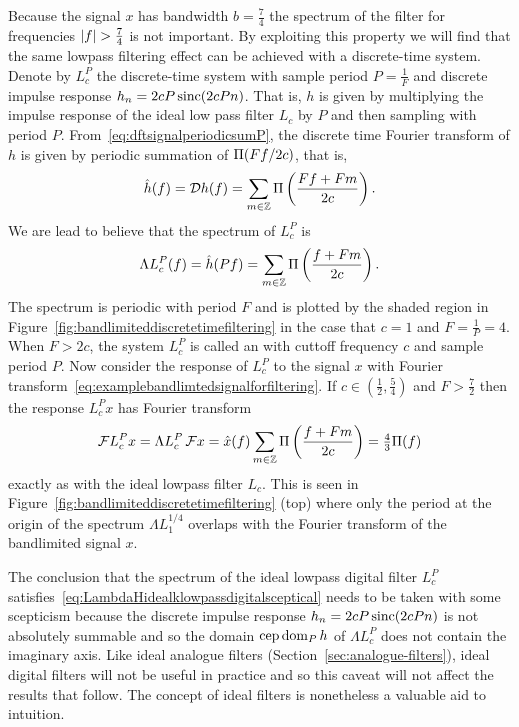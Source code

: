 Because the signal $x$ has bandwidth $b = \tfrac{7}{4}$ the spectrum of the filter for frequencies $\left\vert f \right\vert > \tfrac{7}{4}$ is not important.  By exploiting this property we will find that the same lowpass filtering effect can be achieved with a discrete-time system.  Denote by $L_{c}^P$ the discrete-time system with sample period $P = \tfrac{1}{F}$ and discrete impulse response $h_n = 2cP \operatorname{sinc}(2c Pn)$.  That is, $h$ is given by multiplying the impulse response of the ideal low pass filter $L_c$ by $P$ and then sampling with period $P$.  From~\eqref{eq:dftsignalperiodicsumP}, the discrete time Fourier transform of $h$ is given by periodic summation of $\Pi(Ff/2c)$, that is,
\[
\hat{h}(f) = {\mathcal D} h(f) = \sum_{m \in {\mathbb Z}} \Pi\left( \frac{Ff + Fm}{2c}\right).
\] 
We are lead to believe that the spectrum of $L_c^P$ is
\begin{equation}\label{eq:LambdaHidealklowpassdigitalsceptical}
\Lambda L_c^P(f) = \hat{h}(Pf) = \sum_{m \in {\mathbb Z}} \Pi\left( \frac{f + Fm}{2c}\right).
\end{equation}
The spectrum is periodic with period $F$ and is plotted by the shaded region in Figure~\ref{fig:bandlimiteddiscretetimefiltering} in the case that $c = 1$ and $F = \tfrac{1}{P} = 4$.  When $F > 2c$, the system $L_c^P$ is called an  with cuttoff frequency $c$ and sample period $P$. Now consider the response of $L_c^P$ to the signal $x$ with Fourier transform~\ref{eq:examplebandlimtedsignalforfiltering}.  If $c \in (\tfrac{1}{2}, \tfrac{5}{4})$ and $F > \tfrac{7}{2}$ then the response $L_c^Px$ has Fourier transform
\[
{\mathcal F} L_c^P x = \Lambda L_c^P \, {\mathcal F} x = \hat{x}(f) \sum_{m \in {\mathbb Z}} \Pi\left( \frac{f + Fm}{2c}\right) = \tfrac{4}{3} \Pi(f)
\]
exactly as with the ideal lowpass filter $L_c$.  This is seen in Figure~\ref{fig:bandlimiteddiscretetimefiltering} (top) where only the period at the origin of the spectrum $\Lambda L_1^{1/4}$ overlaps with the Fourier transform of the bandlimited signal $x$.

The conclusion that the spectrum of the ideal lowpass digital filter $L_{c}^P$ satisfies~\eqref{eq:LambdaHidealklowpassdigitalsceptical} needs to be taken with some scepticism because the discrete impulse response $h_n = 2cP\operatorname{sinc}(2c P n)$ is not absolutely summable and so the domain $\operatorname{cep} \operatorname{dom}_P h$ of $\Lambda L_c^P$ does not contain the imaginary axis.  Like ideal analogue filters (Section~\ref{sec:analogue-filters}), ideal digital filters will not be useful in practice and so this caveat will not affect the results that follow. The concept of ideal filters is nonetheless a valuable aid to intuition.  


